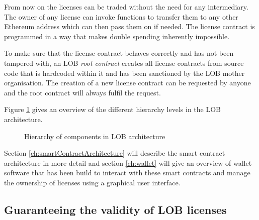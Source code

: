\documentclass[a4paper]{article}
\begin{document}
From now on the licenses can be traded without the need for any intermediary. The owner of any license can invoke functions to transfer them to any other Ethereum address which can then pass them on if needed. The license contract is programmed in a way that makes double spending inherently impossible.

To make sure that the license contract behaves correctly and has not been tampered with, an LOB \emph{root contract} creates all license contracts from source code that is hardcoded within it and has been sanctioned by the LOB mother organisation. The creation of a new license contract can be requested by anyone and the root contract will always fulfil the request.

Figure \ref{fig:smartContractHierarchy} gives an overview of the different hierarchy levels in the LOB architecture.

\begin{figure}
  \centering
  \caption{Hierarchy of components in LOB architecture}
  \label{fig:smartContractHierarchy}
\end{figure}


Section \ref{ch:smartContractArchitecture} will describe the smart contract architecture in more detail and section \ref{ch:wallet} will give an overview of wallet software that has been build to interact with these smart contracts and manage the ownership of licenses using a graphical user interface.





\subsection{Guaranteeing the validity of LOB licenses}
\label{ch:licenseValidityOverview}
\end{document}
